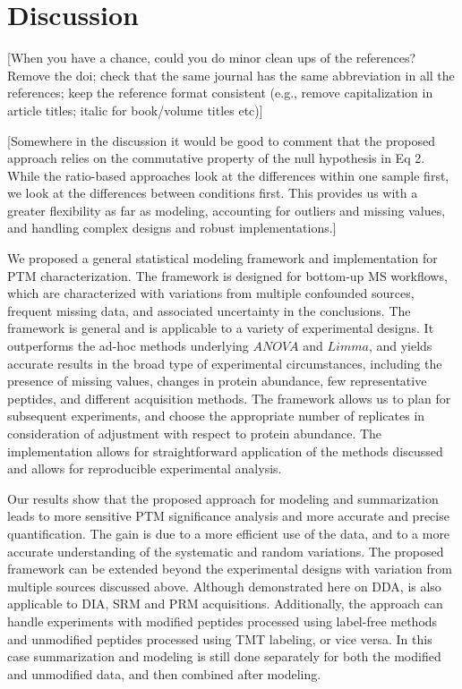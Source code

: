 \documentclass[mcp]{article}
\numberwithin{table}{section}
\def\todo#1{{\color{red}[#1]}}
\begin{document}
\section{Discussion}

\todo{When you have a chance, could you do minor clean ups of the references? Remove the doi; check that the same journal has the same abbreviation in all the references; keep the reference format consistent (e.g., remove capitalization in article titles; italic for book/volume titles etc)} 

\todo{Somewhere in the discussion it would be good to comment that the proposed approach relies on the commutative property of the null hypothesis in Eq 2. While the ratio-based approaches look at the differences within one sample first, we look at the differences between conditions first. This provides us with a greater flexibility as far as modeling, accounting for outliers and missing values, and handling complex designs and robust implementations.}

We proposed a general statistical modeling framework and implementation for PTM characterization. The framework is designed for bottom-up MS workflows, which are characterized with variations from multiple confounded sources, frequent missing data, and associated uncertainty in the conclusions. The framework is general and is applicable to a variety of experimental designs. It outperforms the ad-hoc methods underlying $ANOVA$ and $Limma$, and yields accurate results in the broad type of experimental circumstances, including the presence of missing values, changes in protein abundance, few representative peptides, and different acquisition methods. The framework allows us to plan for subsequent experiments, and choose the appropriate number of replicates in consideration of adjustment with respect to protein abundance. The implementation allows for straightforward application of the methods discussed and allows for reproducible experimental analysis.

Our results show that the proposed approach for modeling and summarization leads to more sensitive PTM significance analysis and more accurate and precise quantification. The gain is due to a more efficient use of the data, and to a more accurate understanding of the systematic and random variations. The proposed framework can be extended beyond the experimental designs with variation from multiple sources discussed above. Although demonstrated here on DDA, is also applicable to DIA, SRM and PRM acquisitions. Additionally, the approach can handle experiments with modified peptides processed using label-free methods and unmodified peptides processed using TMT labeling, or vice versa. In this case summarization and modeling is still done separately for both the modified and unmodified data, and then combined after modeling.
\end{document}
